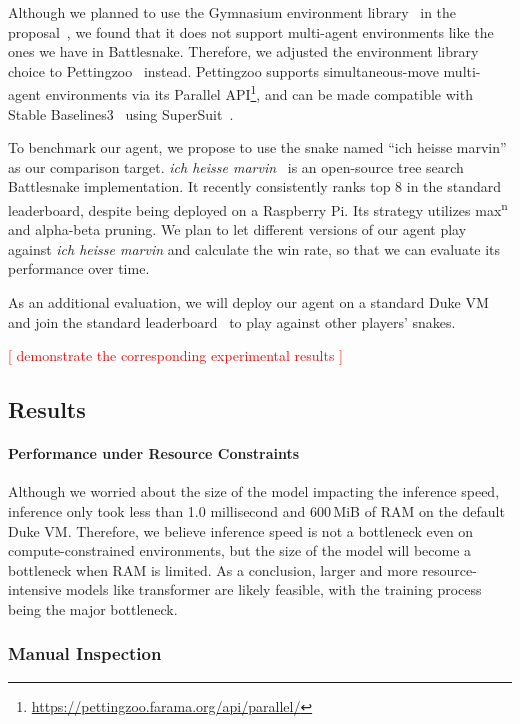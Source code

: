 \documentclass[conference]{IEEEtran}
\newcommand{\todo}[1]{\textcolor{red}{[ #1 ]}}
\begin{document}
Although we planned to use the Gymnasium environment
library~\cite{farama2024gymnasium} in the proposal~\cite{proposal},
we found that it does not support multi-agent environments like the ones we have
in Battlesnake. Therefore,
we adjusted the environment library choice to
Pettingzoo~\cite{terry2021pettingzoo} instead.
Pettingzoo supports simultaneous-move multi-agent environments via its Parallel
API\footnote{\url{https://pettingzoo.farama.org/api/parallel/}},
and can be made compatible with Stable Baselines3~\cite{raffin2024stable}
using SuperSuit~\cite{SuperSuit}.

To benchmark our agent,
we propose to use the snake named ``ich heisse marvin'' as our comparison
target. \emph{ich heisse marvin}~\cite{wrenger2024rusty}
is an open-source tree search Battlesnake implementation.
It recently consistently ranks top 8 in the standard leaderboard,
despite being deployed on a Raspberry Pi. Its strategy utilizes
max\textsuperscript{n} and alpha-beta pruning.
We plan to let different versions of our agent play against \emph{ich heisse
    marvin} and calculate the win rate,
so that we can evaluate its performance over time.

As an additional evaluation,
we will deploy our agent on a standard Duke VM and join the standard
leaderboard~\cite{standard_leaderboard} to play against other players' snakes.

\todo{demonstrate the corresponding experimental results}

\subsection{Results}

\paragraph{Performance under Resource Constraints}
Although we worried about the size of the model impacting the inference speed,
inference only took less than 1.0 millisecond and 600\,MiB of RAM on the default
Duke VM. Therefore,
we believe inference speed is not a bottleneck even on compute-constrained
environments,
but the size of the model will become a bottleneck when RAM is limited.
As a conclusion,
larger and more resource-intensive models like transformer are likely feasible,
with the training process being the major bottleneck.

\subsubsection{Manual Inspection}
\end{document}
